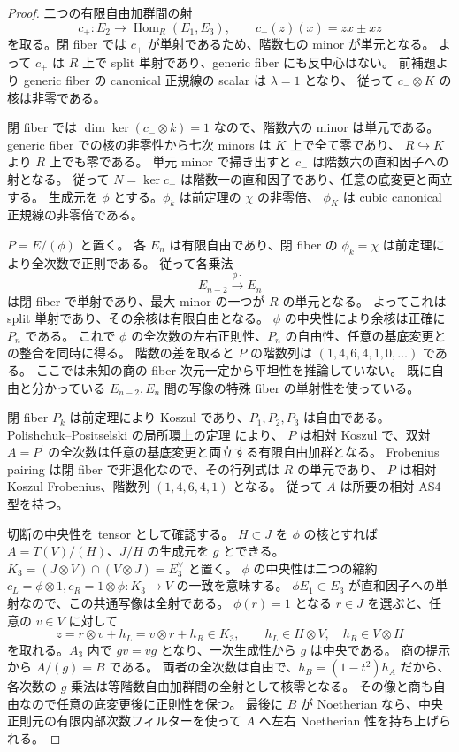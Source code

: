 \begin{proof}
二つの有限自由加群間の射
\[
 c_\pm:E_2\longrightarrow\operatorname{Hom}_R(E_1,E_3),\qquad
 c_\pm(z)(x)=zx\pm xz
\]
を取る。閉 fiber では \(c_+\) が単射であるため、階数七の minor が単元となる。
よって \(c_+\) は \(R\) 上で split 単射であり、generic fiber にも反中心はない。
前補題より generic fiber の canonical 正規線の scalar は \(\lambda=1\) となり、
従って \(c_-\otimes K\) の核は非零である。

閉 fiber では \(\dim\ker(c_-\otimes k)=1\) なので、階数六の minor は単元である。
generic fiber での核の非零性から七次 minors は \(K\) 上で全て零であり、
\(R\hookrightarrow K\) より \(R\) 上でも零である。
単元 minor で掃き出すと \(c_-\) は階数六の直和因子への射となる。
従って \(N=\ker c_-\) は階数一の直和因子であり、任意の底変更と両立する。
生成元を \(\phi\) とする。\(\phi_k\) は前定理の \(\chi\) の非零倍、
\(\phi_K\) は cubic canonical 正規線の非零倍である。

\(P=E/(\phi)\) と置く。
各 \(E_n\) は有限自由であり、閉 fiber の \(\phi_k=\chi\) は前定理により全次数で正則である。
従って各乗法
\[
 E_{n-2}\xrightarrow{\phi\cdot}E_n
\]
は閉 fiber で単射であり、最大 minor の一つが \(R\) の単元となる。
よってこれは split 単射であり、その余核は有限自由となる。
\(\phi\) の中央性により余核は正確に \(P_n\) である。
これで \(\phi\) の全次数の左右正則性、\(P_n\) の自由性、任意の基底変更との整合を同時に得る。
階数の差を取ると \(P\) の階数列は \((1,4,6,4,1,0,\ldots)\) である。
ここでは未知の商の fiber 次元一定から平坦性を推論していない。
既に自由と分かっている \(E_{n-2},E_n\) 間の写像の特殊 fiber の単射性を使っている。

閉 fiber \(P_k\) は前定理により Koszul であり、\(P_1,P_2,P_3\) は自由である。
Polishchuk--Positselski の局所環上の定理
\cite[Chapter 6, Theorem 7.3]{PolishchukPositselski2005} により、
\(P\) は相対 Koszul で、双対 \(A=P^!\) の全次数は任意の基底変更と両立する有限自由加群となる。
Frobenius pairing は閉 fiber で非退化なので、その行列式は \(R\) の単元であり、
\(P\) は相対 Koszul Frobenius、階数列 \((1,4,6,4,1)\) となる。
従って \(A\) は所要の相対 AS4 型を持つ。

切断の中央性を tensor として確認する。
\(H\subset J\) を \(\phi\) の核とすれば \(A=T(V)/(H)\)、\(J/H\) の生成元を \(g\) とできる。
\(K_3=(J\otimes V)\cap(V\otimes J)=E_3^\vee\) と置く。
\(\phi\) の中央性は二つの縮約
\(c_L=\phi\otimes1,c_R=1\otimes\phi:K_3\to V\) の一致を意味する。
\(\phi E_1\subset E_3\) が直和因子への単射なので、この共通写像は全射である。
\(\phi(r)=1\) となる \(r\in J\) を選ぶと、任意の \(v\in V\) に対して
\[
 z=r\otimes v+h_L=v\otimes r+h_R\in K_3,
 \qquad h_L\in H\otimes V,\quad h_R\in V\otimes H
\]
を取れる。\(A_3\) 内で \(gv=vg\) となり、一次生成性から \(g\) は中央である。
商の提示から \(A/(g)=B\) である。
両者の全次数は自由で、\(h_B=(1-t^2)h_A\) だから、
各次数の \(g\) 乗法は等階数自由加群間の全射として核零となる。
その像と商も自由なので任意の底変更後に正則性を保つ。
最後に \(B\) が Noetherian なら、中央正則元の有限内部次数フィルターを使って
\(A\) へ左右 Noetherian 性を持ち上げられる。
\end{proof}

